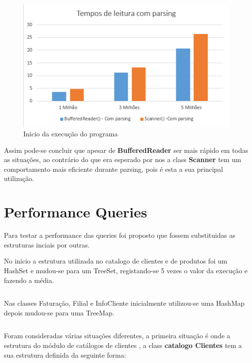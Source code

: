 \begin{figure}[h!]
	\includegraphics[scale=1]{graficocomparsing}  
	\caption{Inicio da execução do programa }  
\end{figure}

\par Assim pode-se concluir que apesar de  \color{blue} \textbf{BufferedReader} \color{black} ser mais rápido em todas as
situações, ao contrário do que era esperado por nos a class  \color{blue} \textbf{Scanner} \color{black} tem um comportamento
mais eficiente durante parsing, pois é esta a sua principal utilização.



\section{Performance Queries }
Para testar a performance das queries foi proposto que fossem substituidas as estruturas inciais por outras. 


No inicio a estrutura utilizada no catalogo de clientes e de produtos foi um HashSet e mudou-se para um TreeSet, registando-se 5 vezes o valor da execução e fazendo a média.

\begin{verbatim}

\end{verbatim}

Nas classes Faturação, Filial e InfoCliente inicialmente utilizou-se uma HashMap depois mudou-se para uma TreeMap. 

\begin{verbatim}

\end{verbatim}

 
Foram consideradas várias situações diferentes, a primeira situação é onde a estrutura do módulo de catálogos de clientes , a class \color{blue} \textbf{catalogo Clientes} \color{black} tem a sua estrutura definida da seguinte forma:

